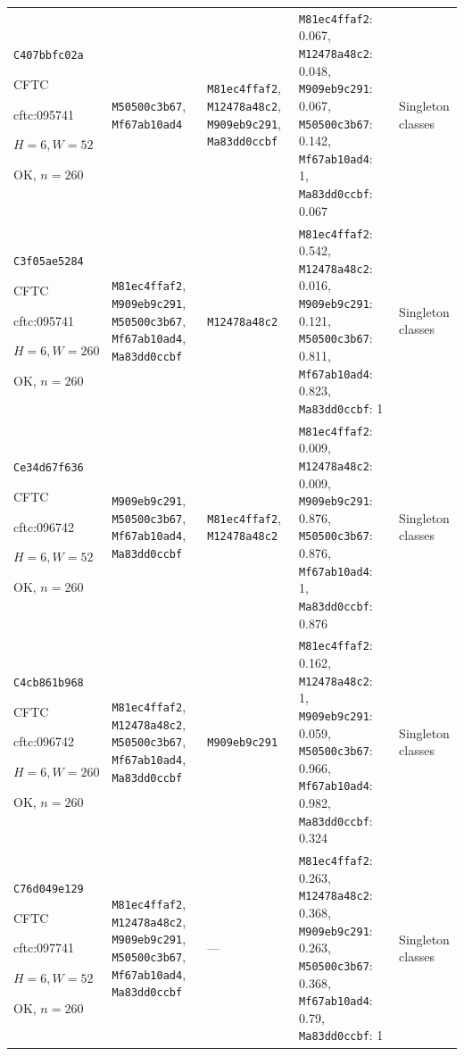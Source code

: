 \begin{longtable}{p{.15\linewidth}p{.17\linewidth}p{.17\linewidth}p{.25\linewidth}p{.14\linewidth}}
\texttt{C407bbfc02a}\par CFTC\par cftc:095741\par $H=6,W=52$\par OK, $n=260$ & \texttt{M50500c3b67}, \texttt{Mf67ab10ad4} & \texttt{M81ec4ffaf2}, \texttt{M12478a48c2}, \texttt{M909eb9c291}, \texttt{Ma83dd0ccbf} & \texttt{M81ec4ffaf2}: 0.067, \texttt{M12478a48c2}: 0.048, \texttt{M909eb9c291}: 0.067, \texttt{M50500c3b67}: 0.142, \texttt{Mf67ab10ad4}: 1, \texttt{Ma83dd0ccbf}: 0.067 & Singleton classes \\
\texttt{C3f05ae5284}\par CFTC\par cftc:095741\par $H=6,W=260$\par OK, $n=260$ & \texttt{M81ec4ffaf2}, \texttt{M909eb9c291}, \texttt{M50500c3b67}, \texttt{Mf67ab10ad4}, \texttt{Ma83dd0ccbf} & \texttt{M12478a48c2} & \texttt{M81ec4ffaf2}: 0.542, \texttt{M12478a48c2}: 0.016, \texttt{M909eb9c291}: 0.121, \texttt{M50500c3b67}: 0.811, \texttt{Mf67ab10ad4}: 0.823, \texttt{Ma83dd0ccbf}: 1 & Singleton classes \\
\texttt{Ce34d67f636}\par CFTC\par cftc:096742\par $H=6,W=52$\par OK, $n=260$ & \texttt{M909eb9c291}, \texttt{M50500c3b67}, \texttt{Mf67ab10ad4}, \texttt{Ma83dd0ccbf} & \texttt{M81ec4ffaf2}, \texttt{M12478a48c2} & \texttt{M81ec4ffaf2}: 0.009, \texttt{M12478a48c2}: 0.009, \texttt{M909eb9c291}: 0.876, \texttt{M50500c3b67}: 0.876, \texttt{Mf67ab10ad4}: 1, \texttt{Ma83dd0ccbf}: 0.876 & Singleton classes \\
\texttt{C4cb861b968}\par CFTC\par cftc:096742\par $H=6,W=260$\par OK, $n=260$ & \texttt{M81ec4ffaf2}, \texttt{M12478a48c2}, \texttt{M50500c3b67}, \texttt{Mf67ab10ad4}, \texttt{Ma83dd0ccbf} & \texttt{M909eb9c291} & \texttt{M81ec4ffaf2}: 0.162, \texttt{M12478a48c2}: 1, \texttt{M909eb9c291}: 0.059, \texttt{M50500c3b67}: 0.966, \texttt{Mf67ab10ad4}: 0.982, \texttt{Ma83dd0ccbf}: 0.324 & Singleton classes \\
\texttt{C76d049e129}\par CFTC\par cftc:097741\par $H=6,W=52$\par OK, $n=260$ & \texttt{M81ec4ffaf2}, \texttt{M12478a48c2}, \texttt{M909eb9c291}, \texttt{M50500c3b67}, \texttt{Mf67ab10ad4}, \texttt{Ma83dd0ccbf} & --- & \texttt{M81ec4ffaf2}: 0.263, \texttt{M12478a48c2}: 0.368, \texttt{M909eb9c291}: 0.263, \texttt{M50500c3b67}: 0.368, \texttt{Mf67ab10ad4}: 0.79, \texttt{Ma83dd0ccbf}: 1 & Singleton classes \\

\end{longtable}
